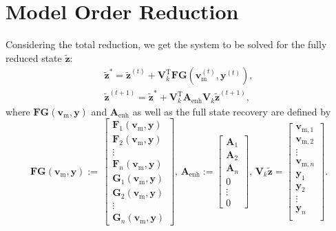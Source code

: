 \section{Model Order Reduction}
Considering the total reduction, we get the system to be solved for the fully reduced state $\tilde{\mathbf{z}}$: 
\begin{equation*}
  \begin{array}{l}
	\tilde{\mathbf{z}}^{*} =
	\tilde{\mathbf{z}}^{(t)}+
	\mathbf{V}_k^{\text{T}} \textbf{FG}(\mathbf{v}_\mathrm{m}^{(t)}, \mathbf{y}^{(t)})
	\label{e:POD_full_a},\\[0.5em]
	\tilde{\mathbf{z}}^{(t+1)} = \tilde{\mathbf{z}}^{*}+\mathbf{V}_k^{\text{T}}
	\textbf{A}_\mathrm{enh} \mathbf{V}_k  \tilde{\mathbf{z}}^{(t+1)},
  \end{array}
\end{equation*}
where $\textbf{FG}(\mathbf{v}_\mathrm{m}, \mathbf{y})$ and $ \textbf{A}_\mathrm{enh}$
as well as the full state recovery are defined by
\begin{equation*}
  \textbf{FG}(\mathbf{v}_\mathrm{m}, \mathbf{y}) := \!  \,\left[\begin{array}{c}
  	\textbf{F}_1(\mathbf{v}_\mathrm{m},\mathbf{y})\\
  	\textbf{F}_2(\mathbf{v}_\mathrm{m},\mathbf{y})\\
  	\vdots \\
  	\textbf{F}_n(\mathbf{v}_\mathrm{m},\mathbf{y})\\
  	\textbf{G}_1(\mathbf{v}_\mathrm{m},\mathbf{y})\\  	
  	\textbf{G}_2(\mathbf{v}_\mathrm{m},\mathbf{y})\\
  	\vdots \\  	
  	\textbf{G}_n(\mathbf{v}_\mathrm{m},\mathbf{y})
  \end{array}\right],\, 
  \textbf{A}_\mathrm{enh} := \left[ \begin{array}{c}
  	\textbf{A}_1\\
  	\textbf{A}_2\\
  	\textbf{A}_n\\
  	0 \\
  	\vdots \\ 	
  	0 
  \end{array} \right], \,
  \mathbf{V}_k  \tilde{\mathbf{z}}=\left[ \begin{array}{c}
  	\mathbf{v}_{\mathrm{m},1} \\
  	\mathbf{v}_{\mathrm{m},2} \\ 
  	\vdots \\ 
  	\mathbf{v}_{\mathrm{m},n} \\	
  	\mathbf{y}_1 \\ 
  	\mathbf{y}_2 \\ 
  	\vdots \\ 
    \mathbf{y}_n \\\end{array} \right].
\end{equation*}
